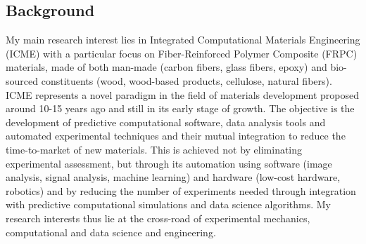 \documentclass[
  a4paper, 
]{fortysecondscv}
\begin{document}
\makefrontsidebar

\subsection{Background}
My main research interest lies in Integrated Computational Materials Engineering (ICME) with a particular focus on Fiber-Reinforced Polymer Composite (FRPC) materials, made of both man-made (carbon fibers, glass fibers, epoxy) and bio-sourced constituents (wood, wood-based products, cellulose, natural fibers). ICME represents a novel paradigm in the field of materials development proposed around 10-15 years ago and still in its early stage of growth. The objective is the development of predictive computational software, data analysis tools and automated experimental techniques and their mutual integration to reduce the time-to-market of new materials. This is achieved not by eliminating experimental assessment, but through its automation using software (image analysis, signal analysis, machine learning) and hardware (low-cost hardware, robotics) and by reducing the number of experiments needed through integration with predictive computational simulations and data science algorithms. My research interests thus lie at the cross-road of experimental mechanics, computational and data science and engineering. 
\end{document}
